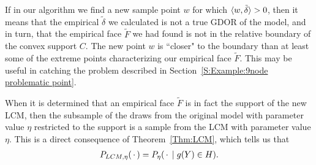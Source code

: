 If in our algorithm we find a new sample point $w$ for which 
$\langle w, \tilde{\delta} \rangle > 0$, then it means that 
the empirical $\tilde{\delta}$ we calculated is not a true GDOR of the model, 
and in turn, that the empirical face $\tilde{F}$ we had
found is not in the relative boundary of the convex support $C$.  
The new point $w$ is ``closer"
to the boundary than at least some of the extreme points characterizing our 
empirical face $\tilde{F}$.
This may be useful in catching the problem described in 
Section~\ref{S:Example:9node problematic point}.

When it is determined that an empirical face $\tilde{F}$ is in fact the support of the new LCM,
then the subsample of the draws from the original model with parameter value $\eta$ 
restricted to the support is a sample from the LCM with 
parameter value $\eta$.  This is a direct consequence of Theorem~\ref{Thm:LCM},
which tells us that
\begin{align*}
P_{LCM, \eta}(\,\cdot\,) = P_\eta( \,\cdot\, \mid g(Y) \in H ).
\end{align*}


